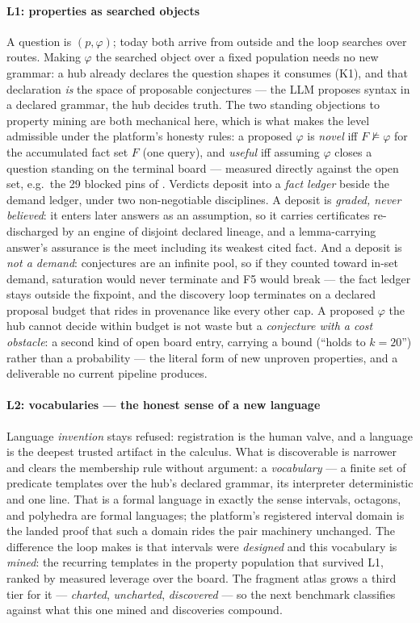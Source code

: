 \paragraph{L1: properties as searched objects}
A question is $(p, \varphi)$; today both arrive from outside and the
loop searches over routes. Making $\varphi$ the searched object over
a fixed population needs no new grammar: a hub already declares the
question shapes it consumes (K1), and that declaration \emph{is} the
space of proposable conjectures --- the LLM proposes syntax in a
declared grammar, the hub decides truth. The two standing objections
to property mining are both mechanical here, which is what makes the
level admissible under the platform's honesty rules: a proposed
$\varphi$ is \emph{novel} iff $F \not\models \varphi$ for the
accumulated fact set $F$ (one query), and \emph{useful} iff assuming
$\varphi$ closes a question standing on the terminal board ---
measured directly against the open set, e.g.\ the 29 blocked pins of
. Verdicts deposit into a \emph{fact ledger} beside
the demand ledger, under two non-negotiable disciplines. A deposit
is \emph{graded, never believed}: it enters later answers as an
assumption, so it carries certificates re-discharged by an engine of
disjoint declared lineage, and a lemma-carrying answer's assurance
is the meet including its weakest cited fact. And a deposit is
\emph{not a demand}: conjectures are an infinite pool, so if they
counted toward in-set demand, saturation would never terminate and
F5 would break --- the fact ledger stays outside the fixpoint, and
the discovery loop terminates on a declared proposal budget that
rides in provenance like every other cap. A proposed $\varphi$ the
hub cannot decide within budget is not waste but a \emph{conjecture
with a cost obstacle}: a second kind of open board entry, carrying a
bound (``holds to $k{=}20$'') rather than a probability --- the
literal form of new unproven properties, and a deliverable no
current pipeline produces.

\paragraph{L2: vocabularies --- the honest sense of a new language}
Language \emph{invention} stays refused: registration is the human
valve, and a language is the deepest trusted artifact in the
calculus. What is discoverable is narrower and clears the membership
rule without argument: a \emph{vocabulary} --- a finite set of
predicate templates over the hub's declared grammar, its interpreter
deterministic and one line. That is a formal language in exactly the
sense intervals, octagons, and polyhedra are formal languages; the
platform's registered interval domain is the landed proof that such
a domain rides the pair machinery unchanged. The difference the loop
makes is that intervals were \emph{designed} and this vocabulary is
\emph{mined}: the recurring templates in the property population
that survived L1, ranked by measured leverage over the board. The
fragment atlas grows a third tier for it --- \emph{charted},
\emph{uncharted}, \emph{discovered} --- so the next benchmark
classifies against what this one mined and discoveries compound.

